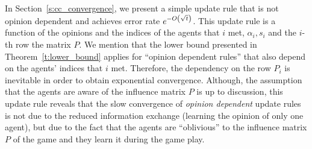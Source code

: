 In Section~\ref{s:cc_convergence}, we present a simple update rule that
is not opinion dependent and  achieves error rate $e^{-O\left(\sqrt{t}\right)}$.
This update rule is a function of the opinions and the indices of the agents
that $i$ met, $\alpha_i,s_i$ and the $i$-th row the matrix $P$.
We mention that the lower bound presented in Theorem~\ref{t:lower_bound}
applies for \enquote{opinion dependent rules} that also depend on the
agents' indices that $i$ met.  Therefore, the dependency on the row $P_i$ is
inevitable in order to obtain exponential convergence.
Although, the assumption that the agents are aware of the influence matrix
$P$ is up to discussion, this update rule reveals that the slow convergence of
\emph{opinion dependent} update rules is not due to the reduced information exchange
(learning the opinion of only one agent), but due to the fact
that the agents are \enquote{oblivious} to the influence matrix $P$ of the
game and they learn it during the game play.
